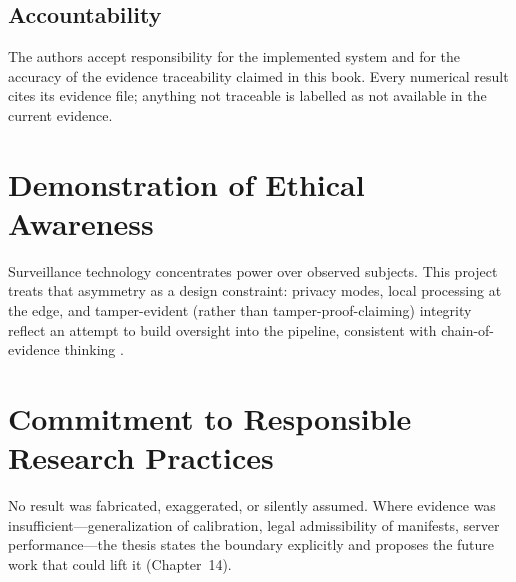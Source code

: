 \subsection{Accountability}

The authors accept responsibility for the implemented system and for the accuracy of the evidence traceability claimed in this book. Every numerical result cites its evidence file; anything not traceable is labelled as not available in the current evidence.

\section{Demonstration of Ethical Awareness}

Surveillance technology concentrates power over observed subjects. This project treats that asymmetry as a design constraint: privacy modes, local processing at the edge, and tamper-evident (rather than tamper-proof-claiming) integrity reflect an attempt to build oversight into the pipeline, consistent with chain-of-evidence thinking \cite{Kanwal2020Chain}.

\section{Commitment to Responsible Research Practices}

No result was fabricated, exaggerated, or silently assumed. Where evidence was insufficient---generalization of calibration, legal admissibility of manifests, server performance---the thesis states the boundary explicitly and proposes the future work that could lift it (Chapter~14).
